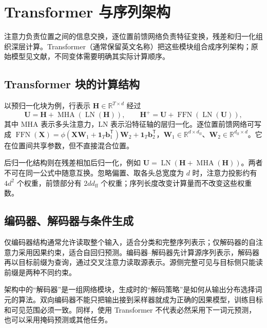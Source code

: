 \setcounter{chapter}{13} %
\chapter{Transformer 与序列架构}
\label{chap:dl-transformer}
注意力负责位置之间的信息交换，逐位置前馈网络负责特征变换，残差和归一化组织深层计算。Transformer（通常保留英文名称）把这些模块组合成序列架构；原始模型见文献\cite{vaswani2017}，不同变体需要明确其实际计算顺序。

\section{Transformer 块的计算结构}
以预归一化块为例，行表示 $\mathbf H\in\mathbb R^{T\times d}$ 经过
\begin{equation}
\mathbf U=\mathbf H+\operatorname{MHA}(\operatorname{LN}(\mathbf H)),\qquad
\mathbf H^+=\mathbf U+\operatorname{FFN}(\operatorname{LN}(\mathbf U)),
\label{eq:dl-transformer-block}
\end{equation}
其中 MHA 表示多头注意力，LN 表示沿特征轴的层归一化。逐位置前馈网络可写成 $\operatorname{FFN}(\mathbf X)=\phi(\mathbf X\mathbf W_1+\mathbf1_T\mathbf b_1^\mathsf T)\mathbf W_2+\mathbf1_T\mathbf b_2^\mathsf T$，$\mathbf W_1\in\mathbb R^{d\times d_{\mathrm{ff}}}$、$\mathbf W_2\in\mathbb R^{d_{\mathrm{ff}}\times d}$。它在位置间共享参数，但不直接混合位置。

后归一化结构则在残差相加后归一化，例如 $\mathbf U=\operatorname{LN}(\mathbf H+\operatorname{MHA}(\mathbf H))$。两者不可在同一公式中随意互换。忽略偏置、取各头总宽度为 $d$ 时，注意力投影约有 $4d^2$ 个权重，前馈部分有 $2dd_{\mathrm{ff}}$ 个权重；序列长度改变计算量而不改变这些权重数。

\section{编码器、解码器与条件生成}
仅编码器结构通常允许读取整个输入，适合分类和完整序列表示；仅解码器的自注意力采用因果约束，适合自回归预测。编码器--解码器先计算源序列表示，解码器再以目标前缀为查询，通过交叉注意力读取源表示。源侧完整可见与目标侧只能读前缀是两种不同约束。

架构中的“解码器”是一组网络模块，生成时的“解码策略”是如何从输出分布选择词元的算法。双向编码器不能只把输出接到采样器就成为正确的因果模型，训练目标和可见范围必须一致。同样，使用 Transformer 不代表必然采用下一词元预测，也可以采用掩码预测或其他任务。

